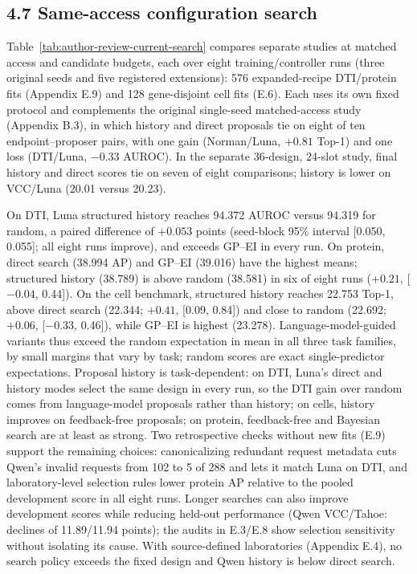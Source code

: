 \begin{samepage}
\subsection*{4.7 Same-access configuration search}
Table~\ref{tab:author-review-current-search} compares separate studies at matched access and candidate budgets, each over eight training/controller runs (three original seeds and five registered extensions): 576 expanded-recipe DTI/protein fits (Appendix E.9) and 128 gene-disjoint cell fits (E.6). Each uses its own fixed protocol and complements the original single-seed matched-access study (Appendix B.3), in which history and direct proposals tie on eight of ten endpoint--proposer pairs, with one gain (Norman/Luna, $+0.81$ Top-1) and one loss (DTI/Luna, $-0.33$ AUROC). In the separate 36-design, 24-slot study, final history and direct scores tie on seven of eight comparisons; history is lower on VCC/Luna (20.01 versus 20.23).
\par\end{samepage}


On DTI, Luna structured history reaches 94.372 AUROC versus 94.319 for random, a paired difference of $+0.053$ points (seed-block 95\% interval [0.050, 0.055]; all eight runs improve), and exceeds GP--EI in every run. On protein, direct search (38.994 AP) and GP--EI (39.016) have the highest means; structured history (38.789) is above random (38.581) in six of eight runs ($+0.21$, [$-0.04$, 0.44]). On the cell benchmark, structured history reaches 22.753 Top-1, above direct search (22.344; $+0.41$, [0.09, 0.84]) and close to random (22.692; $+0.06$, [$-0.33$, 0.46]), while GP--EI is highest (23.278). Language-model-guided variants thus exceed the random expectation in mean in all three task families, by small margins that vary by task; random scores are exact single-predictor expectations. Proposal history is task-dependent: on DTI, Luna's direct and history modes select the same design in every run, so the DTI gain over random comes from language-model proposals rather than history; on cells, history improves on feedback-free proposals; on protein, feedback-free and Bayesian search are at least as strong. Two retrospective checks without new fits (E.9) support the remaining choices: canonicalizing redundant request metadata cuts Qwen's invalid requests from 102 to 5 of 288 and lets it match Luna on DTI, and laboratory-level selection rules lower protein AP relative to the pooled development score in all eight runs. Longer searches can also improve development scores while reducing held-out performance (Qwen VCC/Tahoe: declines of 11.89/11.94 points); the audits in E.3/E.8 show selection sensitivity without isolating its cause. With source-defined laboratories (Appendix E.4), no search policy exceeds the fixed design and Qwen history is below direct search.

